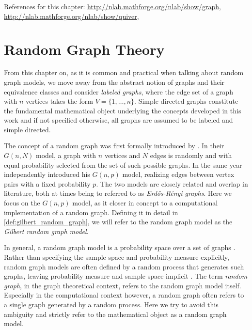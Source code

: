 References for this chapter:
\url{http://nlab.mathforge.org/nlab/show/graph},
\url{http://nlab.mathforge.org/nlab/show/quiver}, \parencite{Bang-Jensen_Digraphs}





  \section{Random Graph Theory}\label{sec:random_graph_theory}


From this chapter on, as it is common and practical when talking about
random graph models, we move away from the abstract notion
of graphs and their equivalence classes and consider \textit{labeled
  graphs}, where the edge set of a graph with $n$ vertices takes the
form $V = \{1,\ldots,n\}$. Simple directed graphs constitute the
fundamental mathematical object underlying the concepts developed in
this work and if not specified otherwise, all graphs are assumed to be
labeled and simple directed.

The concept of a random graph was first formally introduced by
\textcite{Erdos1959}. In their $G(n,N)$ model, a graph with $n$
vertices and $N$ edges is randomly and with equal probability selected
from the set of such possible graphs. In the same year
\textcite{Gilbert1959} independently introduced his $G(n,p)$ model,
realizing edges between vertex pairs with a fixed probability $p$. The
two models are closely related \parencite{Luczak1990} and overlap in
literature, both at times being to referred to as
\textit{Erd\H{o}s-R\'{e}nyi graphs}. Here we focus on the $G(n,p)$
model, as it closer in concept to a computational implementation of a
random graph. Defining it in detail in \ref{def:gilbert_random_graph},
we will refer to the random graph model as the \textit{Gilbert random
  graph model}.

%
In general, a random graph model is a probability space over a set of
graphs \parencite{Janson_Random-graphs}. Rather than specifying the
sample space and probability
measure explicitly, random graph models are often defined by a random
process that generates such graphs, leaving probability measure and
sample space implicit \parencite{Bollobas_Random-graphs}. The term
\textit{random graph}, in the graph theoretical context, refers to the
random graph model itself. Especially in the computational context
however, a random graph often refers to a single graph generated by a
random process. Here we try to avoid this ambiguity and strictly refer
to the mathematical object as a random graph model.

